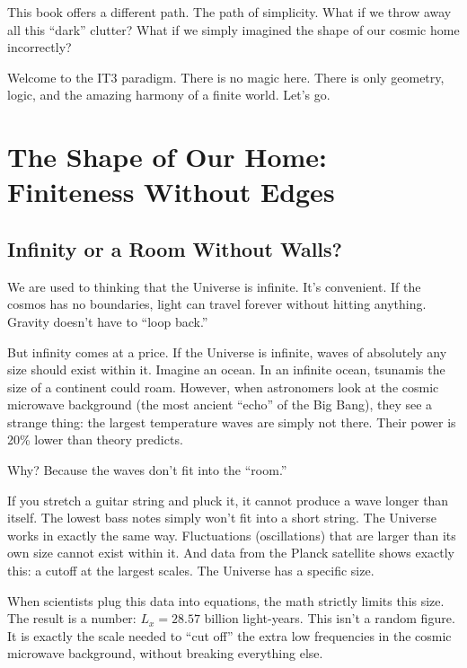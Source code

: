 \documentclass[12pt,a4paper,oneside]{book}
\begin{document}
This book offers a different path. The path of simplicity.
What if we throw away all this “dark” clutter? What if we simply imagined the shape of our cosmic home incorrectly?

Welcome to the IT3 paradigm. There is no magic here. There is only geometry, logic, and the amazing harmony of a finite world. Let's go.

\mainmatter

\chapter{The Shape of Our Home: Finiteness Without Edges}

\section{Infinity or a Room Without Walls?}

We are used to thinking that the Universe is infinite. It's convenient. If the cosmos has no boundaries, light can travel forever without hitting anything. Gravity doesn't have to “loop back.”

But infinity comes at a price. If the Universe is infinite, waves of absolutely any size should exist within it. Imagine an ocean. In an infinite ocean, tsunamis the size of a continent could roam. However, when astronomers look at the cosmic microwave background (the most ancient “echo” of the Big Bang), they see a strange thing: the largest temperature waves are simply not there. Their power is 20\% lower than theory predicts.

Why? Because the waves don't fit into the “room.”

If you stretch a guitar string and pluck it, it cannot produce a wave longer than itself. The lowest bass notes simply won't fit into a short string. The Universe works in exactly the same way. Fluctuations (oscillations) that are larger than its own size cannot exist within it. And data from the Planck satellite shows exactly this: a cutoff at the largest scales. The Universe has a specific size.

When scientists plug this data into equations, the math strictly limits this size. The result is a number: $L_x = 28.57$ billion light-years. This isn't a random figure. It is exactly the scale needed to “cut off” the extra low frequencies in the cosmic microwave background, without breaking everything else.
\end{document}

